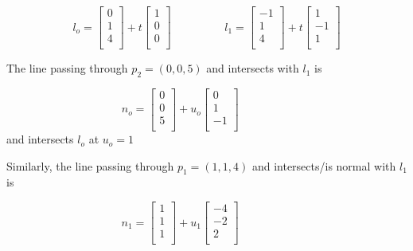 \documentclass[a4paper,10pt]{scrartcl}
\begin{document}
\[ l_o = \begin{bmatrix}
          0 \\
          1 \\
          4 \\
         \end{bmatrix} + t
         \begin{bmatrix}
          1 \\
          0 \\
          0 \\
         \end{bmatrix} \hspace{2cm}
  l_1 = \begin{bmatrix}
	    -1 \\
	    1 \\
	    4 \\
	  \end{bmatrix} + t
	  \begin{bmatrix}
	    1 \\
	    -1 \\
	    1 \\
	  \end{bmatrix}
\]

The line passing through $p_2 = (0, 0, 5)$ and intersects with $l_1$ is

\[
  n_o = \begin{bmatrix}
          0 \\
          0 \\
          5 \\
         \end{bmatrix} + u_o
         \begin{bmatrix}
          0 \\
          1 \\
          -1 \\
         \end{bmatrix} \hspace{2cm}
\] and intersects $l_o$ at $u_o = 1$

Similarly, the line passing through $p_1 = (1, 1, 4)$ and intersects/is normal with $l_1$ is

\[
  n_1 = \begin{bmatrix}
          1 \\
          1 \\
          1 \\
         \end{bmatrix} + u_1
         \begin{bmatrix}
          -4 \\
          -2 \\
          2 \\
         \end{bmatrix} \hspace{2cm}
\]
\end{document}
